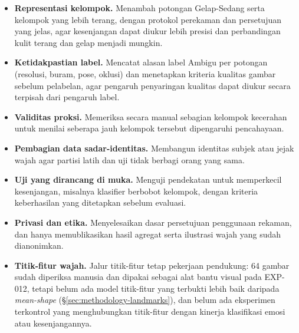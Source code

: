 \begin{itemize}
  \item \textbf{Representasi kelompok.} Menambah potongan Gelap-Sedang serta kelompok yang lebih terang, dengan protokol perekaman dan persetujuan yang jelas, agar kesenjangan dapat diukur lebih presisi dan perbandingan kulit terang dan gelap menjadi mungkin.
  \item \textbf{Ketidakpastian label.} Mencatat alasan label Ambigu per potongan (resolusi, buram, pose, oklusi) dan menetapkan kriteria kualitas gambar sebelum pelabelan, agar pengaruh penyaringan kualitas dapat diukur secara terpisah dari pengaruh label.
  \item \textbf{Validitas proksi.} Memeriksa secara manual sebagian kelompok kecerahan untuk menilai seberapa jauh kelompok tersebut dipengaruhi pencahayaan.
  \item \textbf{Pembagian data sadar-identitas.} Membangun identitas subjek atau jejak wajah agar partisi latih dan uji tidak berbagi orang yang sama.
  \item \textbf{Uji yang dirancang di muka.} Menguji pendekatan untuk memperkecil kesenjangan, misalnya klasifier berbobot kelompok, dengan kriteria keberhasilan yang ditetapkan sebelum evaluasi.
  \item \textbf{Privasi dan etika.} Menyelesaikan dasar persetujuan penggunaan rekaman, dan hanya memublikasikan hasil agregat serta ilustrasi wajah yang sudah dianonimkan.
  \item \textbf{Titik-fitur wajah.} Jalur titik-fitur tetap pekerjaan pendukung: 64 gambar sudah diperiksa manusia dan dipakai sebagai alat bantu visual pada EXP-012, tetapi belum ada model titik-fitur yang terbukti lebih baik daripada \textit{mean-shape} (\S\ref{sec:methodology-landmarks}), dan belum ada eksperimen terkontrol yang menghubungkan titik-fitur dengan kinerja klasifikasi emosi atau kesenjangannya.
\end{itemize}
